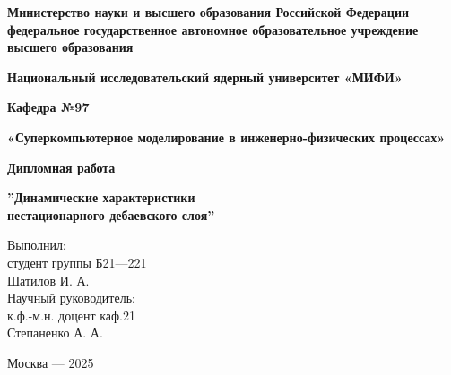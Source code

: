 \documentclass [fontsize=14pt, paper=a4, pagesize, DIV=calc] {scrartcl}
\numberwithin{equation}{section}
\begin{document}
\pagestyle{empty}
\begin{titlepage}
\begin{center}

{\large \textbf{Министерство науки и высшего образования Российской Федерации
федеральное государственное автономное образовательное учреждение высшего образования
}}

\vspace*{1\baselineskip}

{\Large \textbf{Национальный исследовательский ядерный университет «МИФИ»}}

\vspace*{2\baselineskip}

{\Large \textbf{Кафедра №97}}

\vspace*{1\baselineskip}

{\Large \textbf{«Суперкомпьютерное моделирование в инженерно-физических процессах»}}

\vspace*{1\baselineskip}

{\Large \textbf{Дипломная работа}}

\vspace*{1\baselineskip}

{\Large  {\textbf{''Динамические характеристики\\нестационарного дебаевского слоя''}}}

\end{center}
\vspace*{2\baselineskip}
\begin{flushright}
\begin{large}
Выполнил:\\
студент группы Б21---221\\
Шатилов И. А.\\
Научный руководитель:\\
к.ф.-м.н. доцент каф.21\\
Степаненко А. А.
\end{large} 
\end{flushright}

\vspace*{2\baselineskip}
\begin{center}
Москва --- 2025
\end{center}
\end{titlepage}
\pagebreak

\pagestyle{plain}
\tableofcontents
\pagebreak







\clearpage


\end{document}
